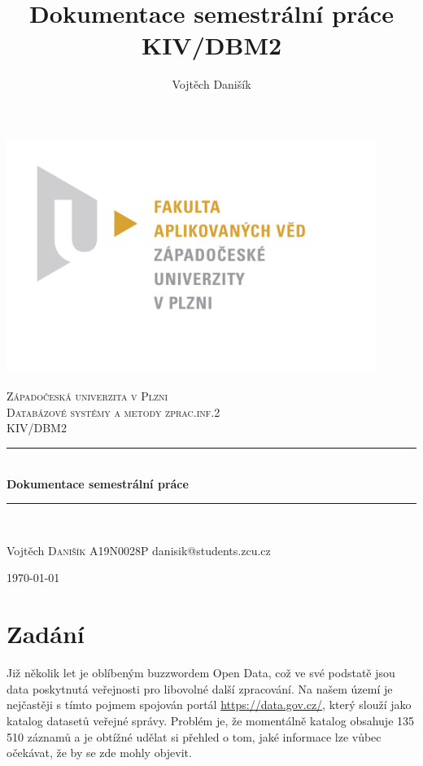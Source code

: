 \documentclass[12pt, a4paper]{article}
\title{\textbf{Dokumentace semestrální práce} \\KIV/DBM2}
\author{Vojtěch Danišík}
\begin{document}
\begin{titlepage} 
	\newcommand{\HRule}{\rule{\linewidth}{0.5mm}} 
	\begin{center}
	\includegraphics[width=12cm]{img/fav_logo}\\
	\end{center}
	\textsc{\LARGE Západočeská univerzita v Plzni}\\[1.5cm] 	
	\textsc{\Large Databázové systémy a metody zprac.inf.2}\\[0.5cm] 
	\textsc{\large KIV/DBM2}\\[0.5cm] 
	\HRule\\[0.4cm]
	{\huge\bfseries Dokumentace semestrální práce}\\[0.4cm] 
	\HRule\\[1.5cm]

	\begin{minipage}{0.4\textwidth}
		\begin{flushleft}
			\large
			Vojtěch \textsc{Danišík}\newline
			A19N0028P\newline
			danisik@students.zcu.cz
		\end{flushleft}
	\end{minipage}
	\vfill\vfill\vfill
	\begin{flushright}
	{\large\today}
	\end{flushright}
	\vfill 
\end{titlepage}
\newpage
\tableofcontents
\newpage

\section{Zadání}
Již několik let je oblíbeným buzzwordem Open Data, což ve své podstatě jsou data poskytnutá veřejnosti pro libovolné další zpracování. Na našem území je nejčastěji s tímto pojmem spojován portál \href{https://data.gov.cz/}{https://data.gov.cz/}, který slouží jako katalog datasetů veřejné správy. Problém je, že momentálně katalog obsahuje 135 510 záznamů a je obtížné udělat si přehled o tom, jaké informace lze vůbec očekávat, že by se zde mohly objevit.
\end{document}
